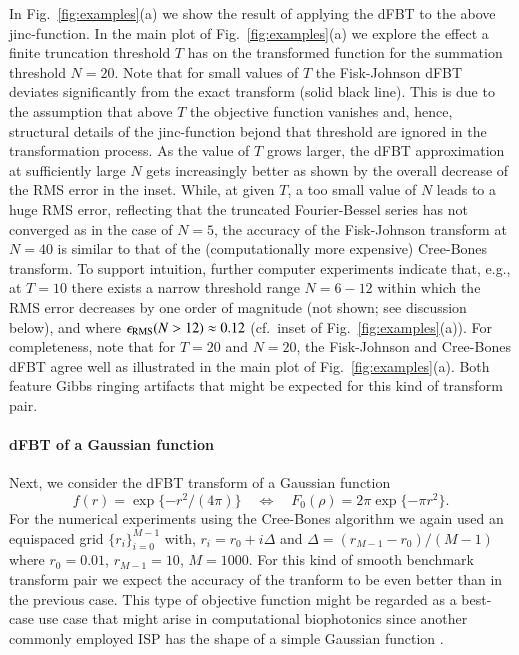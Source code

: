 \documentclass[review]{elsarticle}
\begin{document}
In Fig.~\ref{fig:examples}(a) we show the result of applying the dFBT to the
above {\rm jinc}-function. In the main plot of Fig.~\ref{fig:examples}(a) we
explore the effect a finite truncation threshold $T$ has on the transformed
function for the summation threshold $N=20$. Note that for small values of $T$
the Fisk-Johnson dFBT deviates significantly from the exact transform (solid
black line). This is due to the assumption that above $T$ the objective
function vanishes and, hence, structural details of the {\rm jinc}-function
bejond that threshold are ignored in the transformation process.  As the value
of $T$ grows larger, the dFBT approximation at sufficiently large $N$ gets
increasingly better as shown by the overall decrease of the RMS error in the
inset. While, at given $T$, a too small value of $N$ leads to a huge RMS error,
reflecting that the truncated Fourier-Bessel series has not converged as in the
case of $N=5$, the accuracy of the Fisk-Johnson transform at $N=40$ is similar
to that of the (computationally more expensive) Cree-Bones transform.
To support intuition, further computer experiments indicate that, e.g., at
$T=10$ there exists a narrow threshold range $N=6-12$ within which the RMS
error decreases by one order of magnitude (not shown; see discussion below), and
where $\epsilon_{\rm RMS}(N>12)\approx 0.12$ (cf.\ inset of
Fig.~\ref{fig:examples}(a)).  For completeness, note that for $T=20$ and
$N=20$, the Fisk-Johnson and Cree-Bones dFBT agree well as illustrated in the
main plot of Fig.~\ref{fig:examples}(a). Both feature Gibbs ringing artifacts
that might be expected for this kind of transform pair.

\paragraph{dFBT of a Gaussian function}
Next, we consider the dFBT transform of a Gaussian function
\begin{equation}
f(r) = \exp\{-r^2/(4\pi)\} \quad \Longleftrightarrow \quad F_0(\rho)=2 \pi \exp\{-\pi r^2\}. \label{eq:FBP2}
\end{equation}
For the numerical experiments using the Cree-Bones algorithm we again used an
equispaced grid $\{r_i\}_{i=0}^{M-1}$ with, $r_i=r_0+i\Delta$ and
$\Delta=(r_{M-1}-r_{0})/(M-1)$ where $r_0 = 0.01$, $r_{M-1}=10$, $M=1000$. For this
kind of smooth benchmark transform pair we expect the accuracy of the tranform
to be even better than in the previous case.  This type of objective function
might be regarded as a best-case use case that might arise in computational
biophotonics since another commonly employed ISP has the shape of a simple
Gaussian function \cite{Paltauf:2000,CONV:1997}. 
\end{document}
